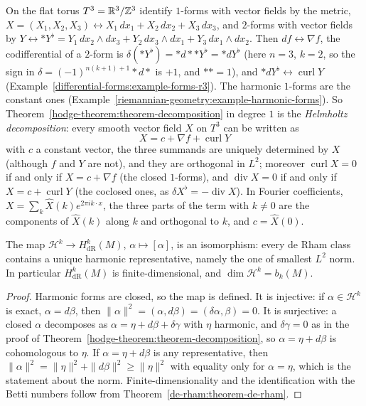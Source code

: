 \begin{example}\label{hodge-theorem:example-helmholtz}
On the flat torus $T^3 = \mathbb{R}^3/\mathbb{Z}^3$ identify $1$-forms with vector fields by the metric, $X = (X_1, X_2, X_3) \leftrightarrow X_1\,dx_1 + X_2\,dx_2 + X_3\,dx_3$, and $2$-forms with vector fields by
$Y \leftrightarrow *Y^\flat = Y_1\,dx_2 \wedge dx_3 + Y_2\,dx_3 \wedge dx_1 + Y_3\,dx_1 \wedge dx_2$. Then $df \leftrightarrow \nabla f$, the codifferential of a $2$-form is $\delta(*Y^\flat) = *d{*}{*}Y^\flat = *dY^\flat$
(here $n = 3$, $k = 2$, so the sign in $\delta = (-1)^{n(k+1)+1}*d*$ is $+1$, and $** = 1$), and $*dY^\flat \leftrightarrow \operatorname{curl}Y$ (Example~\ref{differential-forms:example-forms-r3}). The harmonic
$1$-forms are the constant ones (Example~\ref{riemannian-geometry:example-harmonic-forms}). So Theorem~\ref{hodge-theorem:theorem-decomposition} in degree $1$ is the \emph{Helmholtz decomposition}:
every smooth vector field $X$ on $T^3$ can be written as
\[
X = c + \nabla f + \operatorname{curl}Y
\]
with $c$ a constant vector, the three summands are uniquely determined by $X$ (although $f$ and $Y$ are not), and they are orthogonal in $L^2$; moreover $\operatorname{curl}X = 0$ if and only if $X = c + \nabla f$ (the closed $1$-forms), and $\operatorname{div}X = 0$ if
and only if $X = c + \operatorname{curl}Y$ (the coclosed ones, as $\delta X^\flat = -\operatorname{div}X$). In Fourier coefficients, $X = \sum_k\hat X(k)e^{2\pi ik\cdot x}$, the three parts of the term with
$k \neq 0$ are the components of $\hat X(k)$ along $k$ and orthogonal to $k$, and $c = \hat X(0)$.
\end{example}

\begin{theorem}[Hodge]\label{hodge-theorem:theorem-hodge}
The map $\mathcal{H}^k \to H^k_{\mathrm{dR}}(M)$, $\alpha \mapsto [\alpha]$, is an isomorphism: every de Rham class contains a unique harmonic representative, namely the one of smallest $L^2$ norm. In
particular $H^k_{\mathrm{dR}}(M)$ is finite-dimensional, and $\dim\mathcal{H}^k = b_k(M)$.
\end{theorem}

\begin{proof}
Harmonic forms are closed, so the map is defined. It is injective: if $\alpha \in \mathcal{H}^k$ is exact, $\alpha = d\beta$, then $\|\alpha\|^2 = (\alpha, d\beta) = (\delta\alpha, \beta) = 0$. It is surjective: a closed
$\alpha$ decomposes as $\alpha = \eta + d\beta + \delta\gamma$ with $\eta$ harmonic, and $\delta\gamma = 0$ as in the proof of Theorem~\ref{hodge-theorem:theorem-decomposition}, so $\alpha = \eta + d\beta$ is
cohomologous to $\eta$. If $\alpha = \eta + d\beta$ is any representative, then $\|\alpha\|^2 = \|\eta\|^2 + \|d\beta\|^2 \geq \|\eta\|^2$ with equality only for $\alpha = \eta$, which is the statement about the
norm. Finite-dimensionality and the identification with the Betti numbers follow from Theorem~\ref{de-rham:theorem-de-rham}.
\end{proof}

